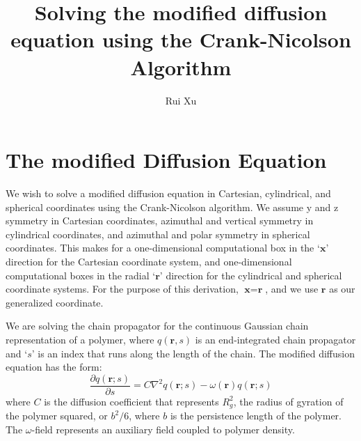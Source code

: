 \documentclass[11pt]{article} %
\title{Solving the modified diffusion equation using the Crank-Nicolson Algorithm}
\author{Rui Xu}
\begin{document}
\maketitle

\section*{The modified Diffusion Equation}
 
 We wish to solve a modified diffusion equation in Cartesian, cylindrical, and spherical coordinates using the Crank-Nicolson algorithm. We assume y and z symmetry in Cartesian coordinates, azimuthal and vertical symmetry in cylindrical coordinates, and azimuthal and polar symmetry in spherical coordinates. This makes for a one-dimensional computational box in the `$\textbf{x}$' direction for the Cartesian coordinate system, and one-dimensional computational boxes in the radial `$\textbf{r}$' direction for the cylindrical and  spherical coordinate systems. For the purpose of this derivation, $\textbf{x}=\textbf{r}$, and we use $\textbf{r}$ as our generalized coordinate.
 
We are solving the chain propagator for the continuous Gaussian chain representation of a polymer, where $q(\textbf{r}, s)$ is an end-integrated chain propagator and `$s$' is an index that runs along the length of the chain. The modified diffusion equation has the form: 
 \begin{equation}
\frac{\partial q(\textbf{r}; s)}{\partial s} = C \nabla^2 q(\textbf{r}; s) - \omega (\textbf{r}) q(\textbf{r}; s)
 \end{equation}
\noindent
where $C$ is the diffusion coefficient that represents $R_g^2$, the radius of gyration of the polymer squared, or $b^2/6$, where $b$ is the persistence length of the polymer. The $\omega$-field represents an auxiliary field coupled to polymer density. 
\end{document}

